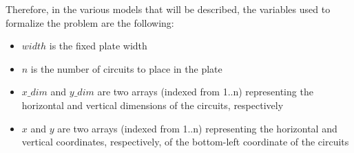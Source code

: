 Therefore, in the various models that will be described, the variables used to formalize the problem are the following:

\begin{itemize}
    \item $width$ is the fixed plate width
    \item $n$ is the number of circuits to place in the plate
    \item $x\_dim$ and $y\_dim$ are two arrays (indexed from 1..n) representing the horizontal and vertical dimensions of the circuits, respectively
    \item $x$ and $y$ are two arrays (indexed from 1..n) representing the horizontal and vertical coordinates, respectively, of the bottom-left coordinate of the circuits
\end{itemize}\

\newpage